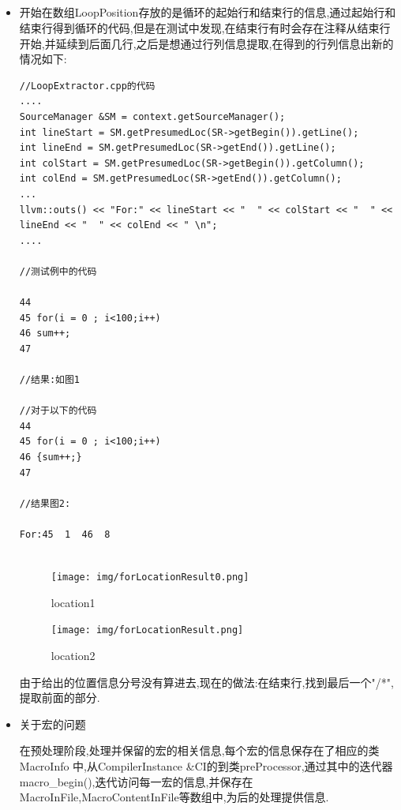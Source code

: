 \subsection{}
\begin{itemize}

\item{}

\par{开始在数组LoopPosition存放的是循环的起始行和结束行的信息,通过起始行和结束行得到循环的代码,但是在测试中发现,在结束行有时会存在注释从结束行开始,并延续到后面几行,之后是想通过行列信息提取,在得到的行列信息出新的情况如下:}

\begin{lstlisting}
//LoopExtractor.cpp的代码
....
SourceManager &SM = context.getSourceManager();
int lineStart = SM.getPresumedLoc(SR->getBegin()).getLine();
int lineEnd = SM.getPresumedLoc(SR->getEnd()).getLine();
int colStart = SM.getPresumedLoc(SR->getBegin()).getColumn();
int colEnd = SM.getPresumedLoc(SR->getEnd()).getColumn();
...
llvm::outs() << "For:" << lineStart << "  " << colStart << "  " << lineEnd << "  " << colEnd << " \n";
....

//测试例中的代码

44 
45 for(i = 0 ; i<100;i++)
46 sum++;
47

//结果:如图1
        
//对于以下的代码
44 
45 for(i = 0 ; i<100;i++)
46 {sum++;}
47 
        
//结果图2:
                
For:45  1  46  8 
                
\end{lstlisting}


\begin{figure}
\centering
\texttt{[image: img/forLocationResult0.png]}
\caption{location1}
\label{forLoactionResult0}
\end{figure}

\begin{figure}
\centering
\texttt{[image: img/forLocationResult.png]}
\caption{location2}
\label{forLoactionResult}
\end{figure}

\par{由于给出的位置信息分号没有算进去,现在的做法:在结束行,找到最后一个"/*",提取前面的部分.}

\item{关于宏的问题}

\par{在预处理阶段,处理并保留的宏的相关信息,每个宏的信息保存在了相应的类MacroInfo 中,从CompilerInstance \&CI的到类preProcessor,通过其中的迭代器macro\_begin(),迭代访问每一宏的信息,并保存在MacroInFile,MacroContentInFile等数组中,为后的处理提供信息.}


\end{itemize}
